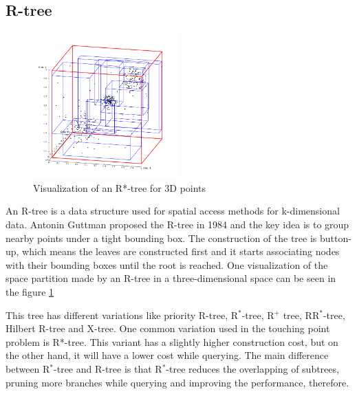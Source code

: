 \subsection{R-tree}
\begin{figure}
    \centering
    \includegraphics[width=0.5\textwidth]{setup/img/RTree-Visualization-3D.png}
    \caption{Visualization of an R*-tree for 3D points \cite{wiki:rtree}}
    \label{fig:rtree}
\end{figure}
An R-tree is a data structure used for spatial access methods for k-dimensional data. Antonin Guttman proposed the R-tree in 1984 \cite{10.1145/971697.602266} and the key idea is to group nearby points under a tight bounding box. The construction of the tree is button-up, which means the leaves are constructed first and it starts associating nodes with their bounding boxes until the root is reached. One visualization of the space partition made by an R-tree in a three-dimensional space can be seen in the figure \ref{fig:rtree}

This tree has different variations like priority R-tree, R$^*$-tree, R$^+$ tree, RR$^*$-tree, Hilbert R-tree and X-tree. One common variation used in the touching point problem is R*-tree. This variant has a slightly higher construction cost, but on the other hand, it will have a lower cost while querying. The main difference between R$^*$-tree and R-tree is that R$^*$-tree reduces the overlapping of subtrees, pruning more branches while querying and improving the performance, therefore. 

\pagebreak
